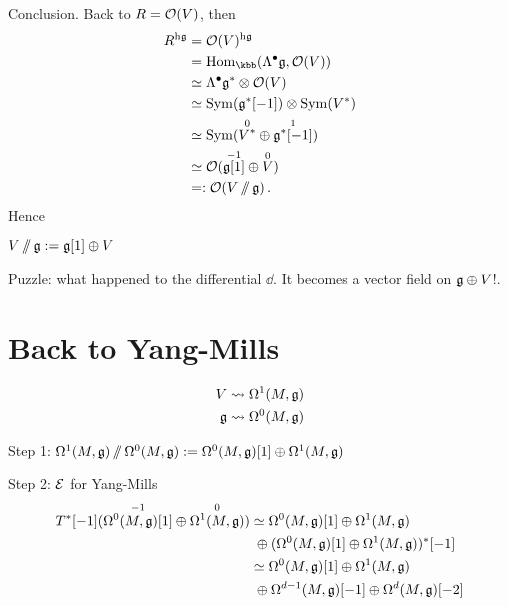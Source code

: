 Conclusion. Back to $R=\mathcal{O} (V)$, then
\begin{align*}
  R^{\mathrm{h}\gfrak}&=\Ocal (V)^{\mathrm{h}\gfrak}\\
                      &=\mathrm{Hom}_{\kbb} (\Lambda^\bullet\gfrak,\Ocal (V))\\
                      &\simeq\Lambda^\bullet\gfrak^*\otimes\Ocal (V)\\
                      &\simeq\Sym (\gfrak^*[-1])\otimes\Sym (V^*)\\
                      &\simeq\Sym (\overset{0}{V^*}\oplus\overset{1}{\gfrak^*[-1]})\\
                      &\simeq\Ocal (\overset{-1}{\gfrak[1]}\oplus \overset{0}{V})\\
                      &=:\Ocal (V\hquot\gfrak)\,.
\end{align*}
Hence
\begin{definition}
  $V\operatorname{/\mkern-6mu/}\mathfrak{g}:=\mathfrak{g}[1]\oplus{}V$
\end{definition}

Puzzle: what happened to the differential
$\dd$. It becomes a vector field on $\mathfrak{g}\oplus{}V$!.

\section{Back to Yang-Mills}

\begin{align*}
  V&\rightsquigarrow\Omega^1 (M,\mathfrak{g})\\
  \mathfrak{g}&\rightsquigarrow\Omega^0 (M,\mathfrak{g})
\end{align*}

Step 1: $\Omega^1 (M,\mathfrak{g})\operatorname{/\mkern-6mu/}\Omega^0 (M,\mathfrak{g}):=\Omega^0 (M,\mathfrak{g})[1]\oplus\Omega^1 (M,\mathfrak{g})$

Step 2: $\mathcal{E}$ for Yang-Mills
\begin{align*}
  T^*[-1] (\overset{-1}{\Omega^0 (M,\mathfrak{g})[1]}\oplus{}\overset{0}{\Omega^1 (M,\mathfrak{g})})
  &\simeq\Omega^0 (M,\mathfrak{g})[1]\oplus\Omega^1 (M,\mathfrak{g})\\
  &\;\oplus (\Omega^0 (M,\mathfrak{g})[1]\oplus\Omega^1 (M,\mathfrak{g}))^*[-1]\\
  &\simeq\Omega^0 (M,\mathfrak{g})[1]\oplus\Omega^1 (M,\mathfrak{g})\\
  &\;\oplus\Omega^{d-1} (M,\mathfrak{g})[-1]\oplus\Omega^d (M,\mathfrak{g})[-2]
\end{align*}
